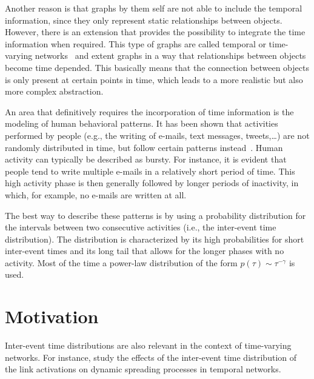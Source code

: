 Another reason is that graphs by them self are not able to include the temporal information, since they only represent static relationships between objects.
However, there is an extension that provides the possibility to integrate the time information when required.
This type of graphs are called temporal or time-varying networks~\cite{Holme2012, Holme2015} and extent graphs in a way that relationships between objects become time depended.
This basically means that the connection between objects is only present at certain points in time, which leads to a more realistic but also more complex abstraction.

An area that definitively requires the incorporation of time information is the modeling of human behavioral patterns.
It has been shown that activities performed by people (e.g., the writing of e-mails, text messages, tweets,\ldots) are not randomly distributed in time, but follow certain patterns instead~\cite{Barabasi2005}.
Human activity can typically be described as bursty.
For instance, it is evident that people tend to write multiple e-mails in a relatively short period of time.
This high activity phase is then generally followed by longer periods of inactivity, in which, for example, no e-mails are written at all.

The best way to describe these patterns is by using a probability distribution for the intervals between two consecutive activities (i.e., the inter-event time distribution).
The distribution is characterized by its high probabilities for short inter-event times and its long tail that allows for the longer phases with no activity.
Most of the time a power-law distribution of the form \( p(\tau) \sim \tau^{-\gamma} \) is used.




\section{Motivation}
\label{sec:motivation}

Inter-event time distributions are also relevant in the context of time-varying networks.
For instance, \citet{Lambiotte2013} study the effects of the inter-event time distribution of the link activations on dynamic spreading processes in temporal networks.

